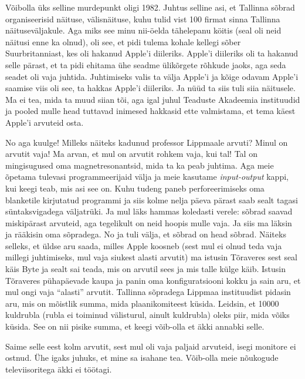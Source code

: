 Võibolla üks selline murdepunkt oligi 1982. Juhtus selline asi, et Tallinna 
sõbrad organiseerisid näituse, välisnäituse, kuhu tulid vist 100 firmat sinna 
Tallinna näituseväljakule. Aga miks see minu nii-öelda tähelepanu köitis (seal 
oli neid näitusi enne ka olnud), oli see, et pidi tulema kohale kellegi sõber 
Suurbritanniast, kes oli hakanud Apple'i diileriks. Apple'i diileriks oli ta 
hakanud selle pärast, et ta pidi ehitama ühe seadme ülikõrgete rõhkude jaoks, 
aga seda seadet oli vaja juhtida. Juhtimiseks valis ta välja Apple'i ja kõige 
odavam Apple'i saamise viis oli see, ta hakkas Apple'i diileriks. Ja nüüd ta 
siis tuli siia näitusele. Ma ei tea, mida ta muud siian tõi, aga igal juhul 
Teaduste Akadeemia instituudid ja pooled mulle head 
tuttavad inimesed hakkasid ette valmistama, et tema käest Apple'i arvuteid 
osta. 

No aga kuulge! Milleks näiteks kadunud professor Lippmaale arvuti? Minul on arvutit vaja! Ma arvan, et mul on arvutit rohkem vaja, 
kui tal! Tal on mingisugused oma magnetresonantsid, mida ta ka peab juhtima. 
Aga meie õpetama tulevasi programmeerijaid välja ja meie kasutame 
\emph{input-output} kappi, kui keegi teab, mis asi see on. Kuhu tudeng paneb  
perforeerimiseks oma blanketile kirjutatud programmi ja siis kolme nelja päeva 
pärast saab sealt tagasi süntaksvigadega väljatrüki. Ja mul läks hammas 
koledasti verele: sõbrad saavad miskipärast arvuteid, aga tegelikult on neid 
hoopis mulle vaja. Ja siis ma läksin ja rääkisin oma sõpradega. No ja tuli 
välja, et sõbrad on head sõbrad. Näiteks selleks, et üldse aru saada, milles 
Apple koosneb (sest mul ei olnud teda vaja millegi juhtimiseks, mul vaja 
siukest alasti arvutit) ma istusin Tõraveres 
sest seal käis Byte ja sealt sai teada, 
mis on arvutil sees ja mis talle külge käib. Istusin Tõraveres pühapäevade 
kaupa ja panin oma konfiguratsiooni kokku ja sain aru, et mul ongi vaja 
\enquote{alasti} arvutit. Tallinna sõpradega Lippmaa 
instituudist pidasin aru, mis on 
mõistlik summa, mida plaanikomiteest küsida. Leidsin, et 10000 kuldrubla (rubla 
ei toiminud välisturul, ainult kuldrubla) oleks piir, mida võiks küsida. See on 
nii pisike summa, et keegi võib-olla et äkki annabki selle. 

Saime selle eest kolm arvutit, sest mul oli vaja paljaid arvuteid, isegi 
monitore ei ostnud. Ühe igaks juhuks, et mine sa isahane tea. Võib-olla meie 
nõukogude televiisoritega äkki ei töötagi. 

